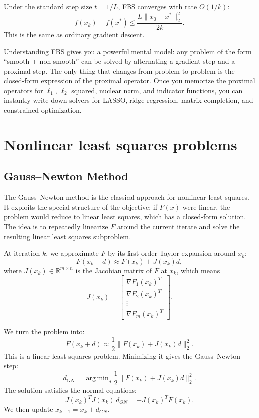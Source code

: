 \documentclass[lang=en,color=blue,mode=fancy,titlestyle=hang]{elegantbook}
\DeclareMathOperator*{\argmin}{arg\,min}
\begin{document}
Under the standard step size $t = 1/L$, FBS converges with rate $O(1/k)$:
\[
f(x_k) - f(x^*) \le \frac{L \|x_0 - x^*\|_2^2}{2k}.
\]
This is the same as ordinary gradient descent.

Understanding FBS gives you a powerful mental model: any problem of the form ``smooth + non-smooth''
can be solved by alternating a gradient step and a proximal step. The only thing that changes from
problem to problem is the closed-form expression of the proximal operator. Once you memorize the
proximal operators for $\ell_1$, $\ell_2$ squared, nuclear norm, and indicator functions, you
can instantly write down solvers for LASSO, ridge regression, matrix completion, and constrained
optimization.

\section{Nonlinear least squares problems}
\subsection{Gauss–Newton Method}

The Gauss–Newton method is the classical approach for nonlinear least squares. It exploits
the special structure of the objective: if $F(x)$ were linear, the problem would reduce to linear
least squares, which has a closed-form solution. The idea is to repeatedly linearize $F$ around
the current iterate and solve the resulting linear least squares subproblem.

At iteration $k$, we approximate $F$ by its first-order Taylor expansion around $x_k$:
\[
F(x_k + d) \approx F(x_k) + J(x_k) d,
\]
where $J(x_k) \in \mathbb{R}^{m \times n}$ is the Jacobian matrix of $F$ at $x_k$, which means
\[
J(x_k) = \begin{bmatrix}
  \nabla F_1(x_k)^T \\
  \nabla F_2(x_k)^T \\
  \vdots \\
  \nabla F_m(x_k)^T
\end{bmatrix}.
\]

We turn the problem into:
\[
F(x_k + d) \approx \frac12 \|F(x_k) + J(x_k) d\|_2^2.
\]
This is a linear least squares problem. Minimizing it gives the Gauss–Newton step:
\[
d_{GN} = \argmin_{d} \frac12 \|F(x_k) + J(x_k) d\|_2^2.
\]
The solution satisfies the normal equations:
\[
J(x_k)^T J(x_k) \, d_{GN} = -J(x_k)^T F(x_k).
\]
We then update $x_{k+1} = x_k + d_{GN}$.
\end{document}
